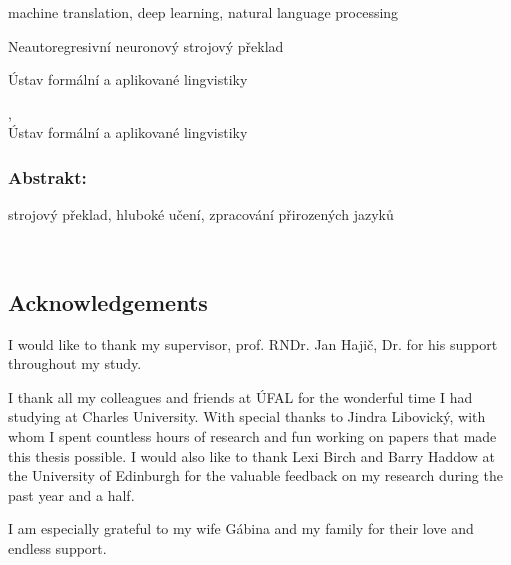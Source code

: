 \documentclass[12pt,notitlepage,a4paper,openright]{report}
\begin{document}


\begin{description}[leftmargin=7.5em,labelwidth=7em,labelindent=0em,labelsep=0.5em]
\item[Keywords:] machine translation, deep learning, natural language processing
\end{description}


\cleardoublepage{}
\begin{description}[leftmargin=7.5em,labelwidth=7em,labelindent=0em,labelsep=0.5em]
\item[Název práce:] Neautoregresivní neuronový strojový překlad
\item[Autor:] \theauthor{}
\item[Katedra:] Ústav formální a aplikované lingvistiky
\item[Vedoucí práce:] \thesupervisor,\\ Ústav formální a aplikované lingvistiky
\end{description}

\subsubsection{Abstrakt:}



\begin{description}[leftmargin=7.5em,labelwidth=7em,labelindent=0em,labelsep=0.5em]
%
\item[Klíčová slova:] strojový překlad, hluboké učení, zpracování přirozených jazyků
%
\end{description}





\cleardoublepage{}
\ \vspace{10mm}

\subsection*{Acknowledgements}

{ I would like to thank my supervisor, prof. RNDr. Jan Hajič, Dr. for his
  support throughout my study.

  \vspace{1\baselineskip}
  \noindent
  I thank all my colleagues and friends at ÚFAL for the wonderful time I had
  studying at Charles University. With special thanks to Jindra Libovický, with
  whom I spent countless hours of research and fun working on papers that made
  this thesis possible. I would also like to thank Lexi Birch and Barry Haddow
  at the University of Edinburgh for the valuable feedback on my research
  during the past year and a half.

  \vspace{1\baselineskip}
  \noindent
  I am especially grateful to my wife Gábina and my family for their love and
  endless support. }
\end{document}

